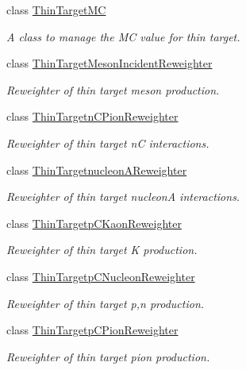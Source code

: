\begin{DoxyCompactItemize}
class \hyperlink{class_neutrino_flux_reweight_1_1_thin_target_m_c}{Thin\-Target\-M\-C}
\begin{DoxyCompactList}\small\item\em A class to manage the M\-C value for thin target. \end{DoxyCompactList}\item 
class \hyperlink{class_neutrino_flux_reweight_1_1_thin_target_meson_incident_reweighter}{Thin\-Target\-Meson\-Incident\-Reweighter}
\begin{DoxyCompactList}\small\item\em Reweighter of thin target meson production. \end{DoxyCompactList}\item 
class \hyperlink{class_neutrino_flux_reweight_1_1_thin_targetn_c_pion_reweighter}{Thin\-Targetn\-C\-Pion\-Reweighter}
\begin{DoxyCompactList}\small\item\em Reweighter of thin target n\-C interactions. \end{DoxyCompactList}\item 
class \hyperlink{class_neutrino_flux_reweight_1_1_thin_targetnucleon_a_reweighter}{Thin\-Targetnucleon\-A\-Reweighter}
\begin{DoxyCompactList}\small\item\em Reweighter of thin target nucleon\-A interactions. \end{DoxyCompactList}\item 
class \hyperlink{class_neutrino_flux_reweight_1_1_thin_targetp_c_kaon_reweighter}{Thin\-Targetp\-C\-Kaon\-Reweighter}
\begin{DoxyCompactList}\small\item\em Reweighter of thin target K production. \end{DoxyCompactList}\item 
class \hyperlink{class_neutrino_flux_reweight_1_1_thin_targetp_c_nucleon_reweighter}{Thin\-Targetp\-C\-Nucleon\-Reweighter}
\begin{DoxyCompactList}\small\item\em Reweighter of thin target p,n production. \end{DoxyCompactList}\item 
class \hyperlink{class_neutrino_flux_reweight_1_1_thin_targetp_c_pion_reweighter}{Thin\-Targetp\-C\-Pion\-Reweighter}
\begin{DoxyCompactList}\small\item\em Reweighter of thin target pion production. \end{DoxyCompactList}\item 

\end{DoxyCompactItemize}
